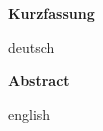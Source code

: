 \begin{center}
	\textbf{Kurzfassung}
\end{center}
\raggedright
deutsch
\clearpage
\begin{center}
	\textbf{Abstract}
\end{center}
\raggedright
english
\clearpage